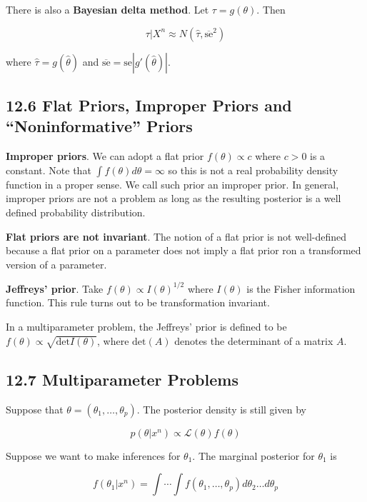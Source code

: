 There is also a \textbf{Bayesian delta method}. Let
\(\tau = g(\theta)\). Then

\[ \tau | X^{n} \approx N(\hat{\tau}, \overline{\text{se}}^{2})\]

where \(\hat{\tau} = g(\hat{\theta})\) and
\(\overline{\text{se}} = \text{se} | g'(\hat{\theta}) |\).

\subsection*{12.6 Flat Priors, Improper Priors and ``Noninformative''
Priors}\label{flat-priors-improper-priors-and-noninformative-priors}

\textbf{Improper priors}. We can adopt a flat prior
\(f(\theta) \propto c\) where \(c > 0\) is a constant. Note that
\(\int f(\theta) d\theta = \infty\) so this is not a real probability
density function in a proper sense. We call such prior an improper
prior. In general, improper priors are not a problem as long as the
resulting posterior is a well defined probability distribution.

\textbf{Flat priors are not invariant}. The notion of a flat prior is
not well-defined because a flat prior on a parameter does not imply a
flat prior ron a transformed version of a parameter.

\textbf{Jeffreys' prior}. Take \(f(\theta) \propto I(\theta)^{1/2}\)
where \(I(\theta)\) is the Fisher information function. This rule turns
out to be transformation invariant.

In a multiparameter problem, the Jeffreys' prior is defined to be
\(f(\theta) \propto \sqrt{\text{det} I(\theta)}\), where
\(\text{det}(A)\) denotes the determinant of a matrix \(A\).

\subsection*{12.7 Multiparameter
Problems}\label{multiparameter-problems}

Suppose that \(\theta = (\theta_{1}, \dots, \theta_p)\). The posterior
density is still given by

\[p(\theta | x^{n}) \propto \mathcal{L}(\theta) f(\theta)\]

Suppose we want to make inferences for \(\theta_{1}\). The marginal
posterior for \(\theta_{1}\) is

\[ f(\theta_{1} | x^{n}) = \int \cdots \int f(\theta_{1}, \dots, \theta_p) d\theta_{2} \dots d\theta_p\]


